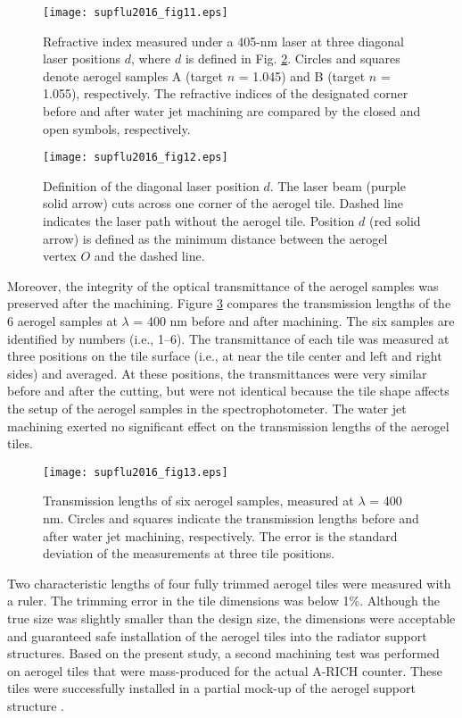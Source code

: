 \documentclass[5p,twocolumn]{elsarticle}
\begin{document}
\begin{figure}[t]
\centering 
\texttt{[image: supflu2016\_fig11.eps]}
\caption{Refractive index measured under a 405-nm laser at three diagonal laser positions $d$, where $d$ is defined in Fig. \ref{fig:fig12}. Circles and squares denote aerogel samples A (target $n$ = 1.045) and B (target $n$ = 1.055), respectively. The refractive indices of the designated corner before and after water jet machining are compared by the closed and open symbols, respectively.}
\label{fig:fig11}
\end{figure}

\begin{figure}[t]
\centering 
\texttt{[image: supflu2016\_fig12.eps]}
\caption{Definition of the diagonal laser position $d$. The laser beam (purple solid arrow) cuts across one corner of the aerogel tile. Dashed line indicates the laser path without the aerogel tile. Position $d$ (red solid arrow) is defined as the minimum distance between the aerogel vertex $O$ and the dashed line.}
\label{fig:fig12}
\end{figure}

Moreover, the integrity of the optical transmittance of the aerogel samples was preserved after the machining. Figure \ref{fig:fig13} compares the transmission lengths of the 6 aerogel samples at $\lambda $ = 400 nm before and after machining. The six samples are identified by numbers (i.e., 1--6). The transmittance of each tile was measured at three positions on the tile surface (i.e., at near the tile center and left and right sides) and averaged. At these positions, the transmittances were very similar before and after the cutting, but were not identical because the tile shape affects the setup of the aerogel samples in the spectrophotometer. The water jet machining exerted no significant effect on the transmission lengths of the aerogel tiles.

\begin{figure}[t]
\centering 
\texttt{[image: supflu2016\_fig13.eps]}
\caption{Transmission lengths of six aerogel samples, measured at $\lambda $ = 400 nm. Circles and squares indicate the transmission lengths before and after water jet machining, respectively. The error is the standard deviation of the measurements at three tile positions.}
\label{fig:fig13}
\end{figure}

Two characteristic lengths of four fully trimmed aerogel tiles were measured with a ruler. The trimming error in the tile dimensions was below 1\%. Although the true size was slightly smaller than the design size, the dimensions were acceptable and guaranteed safe installation of the aerogel tiles into the radiator support structures. Based on the present study, a second machining test was performed on aerogel tiles that were mass-produced for the actual A-RICH counter. These tiles were successfully installed in a partial mock-up of the aerogel support structure \cite{cite21}.
\end{document}
